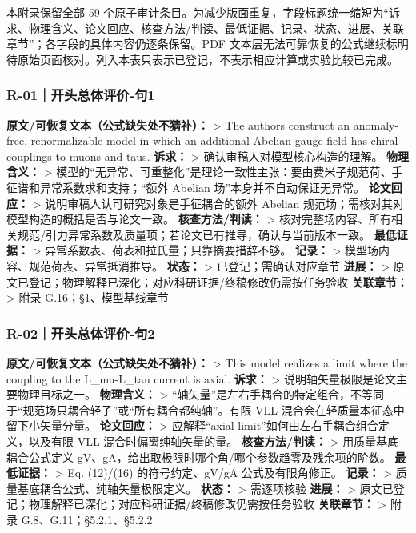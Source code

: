 \documentclass[
]{article}
\begin{document}
本附录保留全部 59
个原子审计条目。为减少版面重复，字段标题统一缩短为``诉求、物理含义、论文回应、核查方法/判读、最低证据、记录、状态、进展、关联章节''；各字段的具体内容仍逐条保留。PDF
文本层无法可靠恢复的公式继续标明待原始页面核对。列入本表只表示已登记，不表示相应计算或实验比较已完成。

\subsubsection{R-01｜开头总体评价-句1}\label{r-01ux5f00ux5934ux603bux4f53ux8bc4ux4ef7-ux53e51}

\textbf{原文/可恢复文本（公式缺失处不猜补）：} \textgreater{} The
authors construct an anomaly-free, renormalizable model in which an
additional Abelian gauge field has chiral couplings to muons and taus.
\textbf{诉求：} \textgreater{} 确认审稿人对模型核心构造的理解。
\textbf{物理含义：} \textgreater{}
模型的``无异常、可重整化''是理论一致性主张：要由费米子规范荷、手征谱和异常系数求和支持；``额外
Abelian 场''本身并不自动保证无异常。 \textbf{论文回应：} \textgreater{}
说明审稿人认可研究对象是手征耦合的额外 Abelian
规范场；需核对其对模型构造的概括是否与论文一致。
\textbf{核查方法/判读：} \textgreater{}
核对完整场内容、所有相关规范/引力异常系数及质量项；若论文已有推导，确认与当前版本一致。
\textbf{最低证据：} \textgreater{}
异常系数表、荷表和拉氏量；只靠摘要措辞不够。 \textbf{记录：}
\textgreater{} 模型场内容、规范荷表、异常抵消推导。 \textbf{状态：}
\textgreater{} 已登记；需确认对应章节 \textbf{进展：} \textgreater{}
原文已登记；物理解释已深化；对应科研证据/终稿修改仍需按任务验收
\textbf{关联章节：} \textgreater{} 附录 G.16；§1、模型基线章节

\subsubsection{R-02｜开头总体评价-句2}\label{r-02ux5f00ux5934ux603bux4f53ux8bc4ux4ef7-ux53e52}

\textbf{原文/可恢复文本（公式缺失处不猜补）：} \textgreater{} This model
realizes a limit where the coupling to the L\_mu-L\_tau current is
axial. \textbf{诉求：} \textgreater{}
说明轴矢量极限是论文主要物理目标之一。 \textbf{物理含义：}
\textgreater{}
``轴矢量''是左右手耦合的特定组合，不等同于``规范场只耦合轻子''或``所有耦合都纯轴''。有限
VLL 混合会在轻质量本征态中留下小矢量分量。 \textbf{论文回应：}
\textgreater{} 应解释``axial limit''如何由左右手耦合组合定义，以及有限
VLL 混合时偏离纯轴矢量的量。 \textbf{核查方法/判读：} \textgreater{}
用质量基底耦合公式定义
gV、gA，给出取极限时哪个角/哪个参数趋零及残余项的阶数。
\textbf{最低证据：} \textgreater{} Eq. (12)/(16) 的符号约定、gV/gA
公式及有限角修正。 \textbf{记录：} \textgreater{}
质量基底耦合公式、纯轴矢量极限定义。 \textbf{状态：} \textgreater{}
需逐项核验 \textbf{进展：} \textgreater{}
原文已登记；物理解释已深化；对应科研证据/终稿修改仍需按任务验收
\textbf{关联章节：} \textgreater{} 附录 G.8、G.11；§5.2.1、§5.2.2
\end{document}
